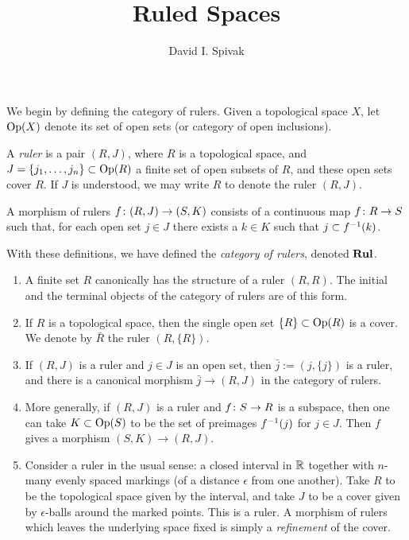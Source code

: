 \documentclass{amsart}
\def\Rul{{\bf Rul}}
\def\j{\bar{j}}
\begin{document}
\title{Ruled Spaces}

\author{David I. Spivak}

\maketitle

We begin by defining the category of rulers.  Given a topological space $X$, let $\textnormal{Op}(X)$ denote its set of open sets (or category of open inclusions).

\begin{definition}

A {\em ruler} is a pair $(R,J)$, where $R$ is a topological space, and $J=\{j_1,\ldots,j_n\}\subset\textnormal{Op}(R)$ a finite set of open subsets of $R$, and these open sets cover $R$.  If $J$ is understood, we may write $R$ to denote the ruler $(R,J)$.

A morphism of rulers $f\colon (R,J)\rightarrow(S,K)$ consists of a continuous map $f\colon R\rightarrow S$ such that, for each open set $j\in J$ there exists a $k\in K$ such that $j\ss f^\m1(k)$.

With these definitions, we have defined the {\em category of rulers}, denoted $\Rul$.

\end{definition}

\begin{example}

\begin{enumerate}

\item A finite set $R$ canonically has the structure of a ruler $(R,R)$.  The initial and the terminal objects of the category of rulers are of this form.
\item If $R$ is a topological space, then the single open set $\{R\}\subset\textnormal{Op}(R)$ is a cover.  We denote by $\bar{R}$ the ruler $(R,\{R\})$.
\item If $(R,J)$ is a ruler and $j\in J$ is an open set, then $\j:=(j,\{j\})$ is a ruler, and there is a canonical morphism $\j\to (R,J)$ in the category of rulers. 
\item More generally, if $(R,J)$ is a ruler and $f\colon S\rightarrow R$ is a subspace, then one can take $K\subset\textnormal{Op}(S)$ to be the set of preimages $f^\m1(j)$ for $j\in J$.  Then $f$ gives a morphism $(S,K)\to(R,J)$.

\item Consider a ruler in the usual sense: a closed interval in ${\mathbb R}$ together with $n$-many evenly spaced markings (of a distance $\epsilon$ from one another).  Take $R$ to be the topological space given by the interval, and take $J$ to be a cover given by $\epsilon$-balls around the marked points.  This is a ruler.  A morphism of rulers which leaves the underlying space fixed is simply a {\em refinement} of the cover.

\end{enumerate}

\end{example}
\end{document}
